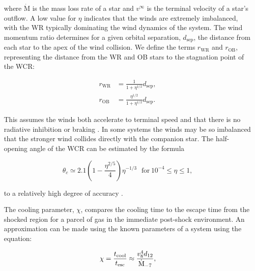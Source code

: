 \documentclass[fleqn,usenatbib]{mnras}
\begin{document}
\noindent
where $\dot{\text{M}}$ is the mass loss rate of a star and $v^\infty$ is the terminal velocity of a star's outflow.
A low value for $\eta$ indicates that the winds are extremely imbalanced, with the WR typically dominating the wind dynamics of the system.
The wind momentum ratio determines for a given orbital separation, $d_\text{sep}$, the distance from each star to the apex of the wind collision.
We define the terms $r_\text{WR}$ and $r_\text{OB}$, representing the distance from the WR and OB stars to the stagnation point of the WCR:

\begin{subequations}
  \begin{align}
    r_\text{WR} & = \frac{1}{1+\eta^{1/2}} d_\text{sep} , \\
    r_\text{OB} & = \frac{\eta^{1/2}}{1+\eta^{1/2}} d_\text{sep} .
  \end{align}
\end{subequations}

\noindent
This assumes the winds both accelerate to terminal speed and that there is no radiative inhibition \citep{stevens_stagnation-point_1994} or braking \citep{gayley_sudden_1997}.
In some systems the winds may be so imbalanced that the stronger wind collides directly with the companion star.
The half-opening angle of the WCR can be estimated by the formula

\begin{equation}
  \theta_c \simeq 2.1 \left( 1 - \frac{\eta^{2/5}}{4}\right) \eta^{-1/3} ~~~ \text{for} ~ 10^{-4} \leq \eta \leq 1 ,
\end{equation}

\noindent
to a relatively high degree of accuracy \citep{eichler_particle_1993,pittardCollidingStellarWinds2018}.

The cooling parameter, $\chi$, compares the cooling time to the escape time from the shocked region for a parcel of gas in the immediate post-shock environment. An approximation can be made using the known parameters of a system using the equation:

\begin{equation}
    \label{eq:paper1-chi}
    \chi = \frac{t_\text{cool}}{t_\text{esc}} \approx \frac{v_8^4 d_{12}}{\dot{\text M}_{-7}} , 
\end{equation}
\end{document}

